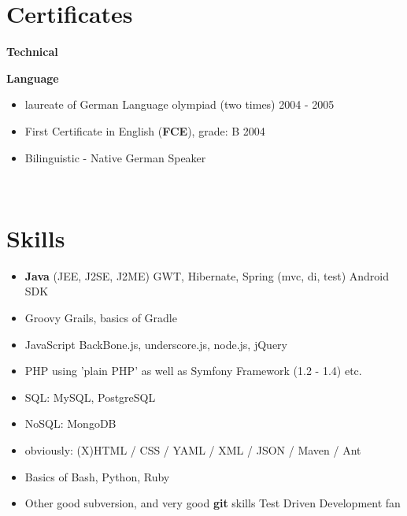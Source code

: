 \documentclass{res}
\begin{document}
\begin{resume}
\section{Certificates} 
{\bf Technical}
{\bf Language}
\begin{itemize}
 \item laureate of German Language olympiad (two times) \hfill 2004 - 2005
 \item First Certificate in English (\textbf{FCE}), grade: B \hfill 2004
 \item Bilinguistic - Native German Speaker
\end{itemize}

\\
\section{Skills}
\begin{itemize}
 \item \textbf{Java} (JEE, J2SE, J2ME)
 \subitem GWT, Hibernate, Spring (mvc, di, test)
 \subitem Android SDK
 \item Groovy
  \subitem Grails, basics of Gradle
 \item JavaScript
  \subitem BackBone.js, underscore.js, node.js, jQuery
 \item PHP
  \subitem using 'plain PHP' as well as Symfony Framework (1.2 - 1.4) etc.
 \item SQL: MySQL, PostgreSQL
 \item NoSQL: MongoDB 
 \item obviously: (X)HTML / CSS / YAML / XML / JSON / Maven / Ant
 \item Basics of
  \subitem Bash, Python, Ruby
 \item Other
  \subitem good subversion, and very good \textbf{git} skills
  \subitem Test Driven Development fan
\end{itemize}


\end{resume}
\end{document}
